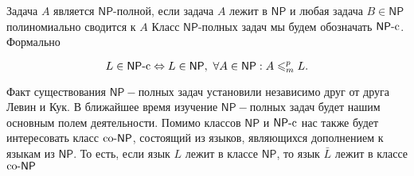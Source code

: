 \documentclass[12pt, leqno]{article}
\theoremstyle{definiton}
\newtheorem*{known}{Теорема}
\theoremstyle{definition}
\theoremstyle{definition}
\newtheorem{Example}{Пример}
\let\leq\leqslant
\def\PP{{\mathsf{P}}}
\def\NP{{\mathsf{NP}}}
\def\NPc{{\mathsf{NP}}\text{-}{\rm c}}
\def\coNP{{\rm co}\text{-}{\mathsf{NP}}}
\def\SAT{{\rm{SAT}}}
\def\3SAT{{\rm{3\text{-}SAT}}}
\def\2SAT{{\rm{2\text{-}SAT}}}
\def\UNSAT{{\rm{UNSAT}}}
\newcounter{problem}
\newcounter{uproblem}
\newcounter{subproblem}
\def\prp{\medskip\noindent\stepcounter{problem}{\bf Задача \theproblem .  }\setcounter{subproblem}{0} }
\def\upr{\medskip\noindent\stepcounter{uproblem}{\bf Упражнение \theuproblem .  }\setcounter{subproblem}{0} }
\begin{document}
\bigskip

Задача $A$ является $\NP$-полной, если задача $A$ лежит в $\NP$ и любая задача $B \in \NP$ полиномиально сводится к $A$
Класс $\NP$-полных задач мы будем обозначать  $\NPc$. Формально

$$
 L \in \NPc \Leftrightarrow L \in \NP,\ \forall A \in \NP: A \leq^p_m L.
$$

Факт существования $\NP-$полных задач установили независимо друг от друга Левин и Кук. В ближайшее время изучение $\NP-$полных задач будет нашим основным полем деятельности.
Помимо классов $\NP$ и $\NPc$ нас также будет интересовать класс $\coNP$, состоящий из языков, являющихся дополнением к языкам из $\NP$. То есть, если язык $L$ лежит в классе $\NP$, то язык $\bar L$ лежит в классе $\coNP$ 



\begin{comment}
	


\section{$\NP$-полные задачи}

Задача $A$ является $\NP$-полной, если задача $A$ лежит в $\NP$ и любая задача $B \in \NP$ полиномиально сводится к $A$
Класс $\NP$-полных задач мы будем обозначать  $\NPc$. Формально

$$
 L \in \NPc \Leftrightarrow L \in \NP,\ \forall A \in \NP: A \leq^p_m L.
$$

Приведём пример $\NP$-полной задачи.

\begin{Example}
	Язык $\SAT$ состоит из всех выполнимых булевых формул $\phi$, заданных в конъюнктивной нормальной форме.
	$$
		\SAT = \{ \phi\,|\, \exists y_1, \ldots,y_n : \phi(y_1,\ldots,y_n ) = 1 \}
	$$
\end{Example}

\begin{known}[Кук, Левин]
	Язык $\SAT$ является $\NP$-полным.
\end{known}

\upr Изучить доказательство теоремы Кука-Левина.

Определим язык $\3SAT$ как язык, состоящий из выполнимых булевых формул, каждый дизъюнкт которых содержит ровно три переменных. Пример такой формулы:
$$ 
	\phi = (x_1\vee x_2 \vee \neg x_3) \wedge (\neg x_4 \vee x_5 \vee x_1).
$$

\prp Показать, что $\3SAT \in \NPc$

\prp Показать, что $\2SAT \in \PP$.

Также нам интересен класс $\coNP$, состоящий из языков, дополнение которых лежит в $\NP$.


Определим язык $\UNSAT$ как язык состоящий из невыполнимых булевых формул, заданных КНФ. То есть
$$
	\UNSAT = \{ \phi\,|\, \forall y_1, \ldots,y_n : \phi(y_1,\ldots,y_n ) = 0 \}
$$

\upr Показать, что язык $\UNSAT$ лежит в классе $\coNP$.

\end{comment}
\end{document}
